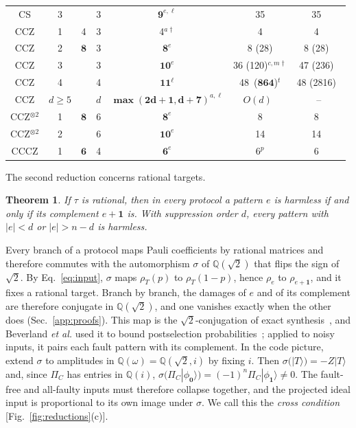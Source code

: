 \documentclass[aps,prl,reprint,twocolumn,amsmath,amssymb,floatfix,nofootinbib,superscriptaddress]{revtex4-2}
\newtheorem{theorem}{Theorem}
\newcommand{\QuarticUB}{48}
\newcommand{\QuarticCoef}{864}
\begin{document}
\begin{table}[t]
\begin{ruledtabular}
\begin{tabular}{ccccccc}
CS & 3 & & 3 & $\mathbf{9}^{e,\ell}$ & 35 & 35~\cite{nezamihaah,wjs} \\
CCZ & 1 & 4 & 3 & 4$^{a\dagger}$ & 4 & 4~\cite{jones} \\
CCZ & 2 & $\mathbf{8}$ & 3 & $\mathbf{8}^e$ & 8 (28) & 8 (28)~\cite{eastin,jones,haah} \\
CCZ & 3 & & 3 & $\mathbf{10}^e$ & 36 (120)$^{c,m\dagger}$ & 47 (236)~\cite{jacinto,wjs} \\
CCZ & 4 & & 4 & $\mathbf{11}^\ell$ & \QuarticUB\ ($\mathbf{\QuarticCoef}$)$^t$ & 48 (2816)~\cite{jacinto} \\
CCZ & $d\geq5$ & & $d$ & $\mathbf{\max(2d{+}1,d{+}7)}^{a,\ell}$ & $O(d)$~\cite{golowich,nguyen} & -- \\
CCZ$^{\otimes2}$ & 1 & $\mathbf{8}$ & 6 & $\mathbf{8}^e$ & 8 & 8~\cite{jones} \\
CCZ$^{\otimes2}$ & 2 & & 6 & $\mathbf{10}^e$ & 14 & 14~\cite{campbellhoward} \\
CCCZ & 1 & $\mathbf{6}$ & 4 & $\mathbf{6}^e$ & 6$^p$ & 6~\cite{beverland} \\
\end{tabular}
\end{ruledtabular}
\end{table}

The second reduction concerns rational targets.
\begin{theorem}\label{thm:pairing}
If $\tau$ is rational, then in every protocol a pattern $e$ is harmless if and only if its complement $e+\mathbf1$ is. With suppression order $d$, every pattern with $|e|<d$ or $|e|>n-d$ is harmless.
\end{theorem}
Every branch of a protocol maps Pauli coefficients by rational matrices and therefore commutes with the automorphism $\sigma$ of $\mathbb Q(\sqrt2)$ that flips the sign of $\sqrt2$. By Eq.~\eqref{eq:input}, $\sigma$ maps $\rho_T(p)$ to $\rho_T(1-p)$, hence $\rho_e$ to $\rho_{e+\mathbf1}$, and it fixes a rational target. Branch by branch, the damages of $e$ and of its complement are therefore conjugate in $\mathbb Q(\sqrt2)$, and one vanishes exactly when the other does (Sec.~\ref{app:proofs}). This map is the $\sqrt2$-conjugation of exact synthesis~\cite{rossselinger}, and Beverland \emph{et al.} used it to bound postselection probabilities~\cite[Proposition~5.8]{beverland}; applied to noisy inputs, it pairs each fault pattern with its complement. In the code picture, extend $\sigma$ to amplitudes in $\mathbb Q(\omega)=\mathbb Q(\sqrt2,i)$ by fixing $i$. Then $\sigma(|T\rangle)=-Z|T\rangle$ and, since $\Pi_C$ has entries in $\mathbb Q(i)$, $\sigma(\Pi_C|\phi_{\mathbf0}\rangle)=(-1)^n\Pi_C|\phi_{\mathbf1}\rangle\neq0$. The fault-free and all-faulty inputs must therefore collapse together, and the projected ideal input is proportional to its own image under $\sigma$. We call this the \emph{cross condition} [Fig.~\ref{fig:reductions}(c)].
\end{document}

